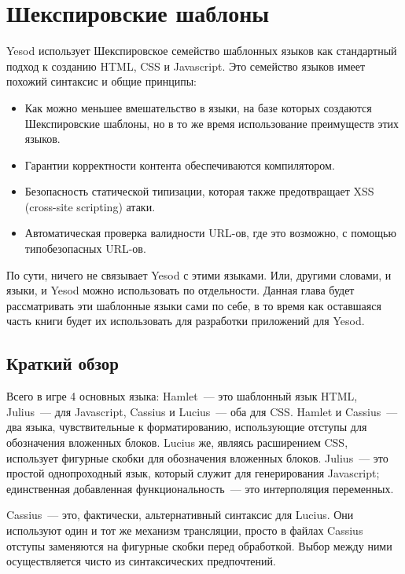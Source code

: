 \chapter{Шекспировские шаблоны}\label{chap:shakespeare}

Yesod использует Шекспировское семейство шаблонных языков как стандартный
подход к созданию HTML, CSS и Javascript. Это семейство языков имеет похожий
синтаксис и общие принципы:
\begin{itemize}
    \item Как можно меньшее вмешательство в языки, на базе которых создаются
        Шекспировские шаблоны, но в то же время использование преимуществ этих
        языков.

    \item Гарантии корректности контента обеспечиваются компилятором.

    \item Безопасность статической типизации, которая также предотвращает
        XSS (cross-site scripting) атаки.

    \item Автоматическая проверка валидности URL-ов, где это возможно, с
        помощью типобезопасных URL-ов.
\end{itemize}

По сути, ничего не связывает Yesod с этими языками. Или, другими словами, и
языки, и Yesod можно использовать по отдельности. Данная глава будет
рассматривать эти шаблонные языки сами по себе, в то время как оставшаяся часть
книги будет их использовать для разработки приложений для Yesod.

\section{Краткий обзор}

Всего в игре 4 основных языка: Hamlet~--- это шаблонный язык HTML, Julius~---
для Javascript, Cassius и Lucius~--- оба для CSS. Hamlet и Cassius~--- два
языка, чувствительные к форматированию, использующие отступы для обозначения
вложенных блоков. Lucius же, являясь расширением CSS, использует фигурные
скобки для обозначения вложенных блоков.  Julius~--- это простой однопроходный
язык, который служит для генерирования Javascript; единственная добавленная
функциональность~--- это интерполяция переменных.

\begin{remark}
    Cassius~--- это, фактически, альтернативный синтаксис для Lucius. Они
    используют один и тот же механизм трансляции, просто в файлах Cassius
    отступы заменяются на фигурные скобки перед обработкой. Выбор между ними
    осуществляется чисто из синтаксических предпочтений.
\end{remark}

